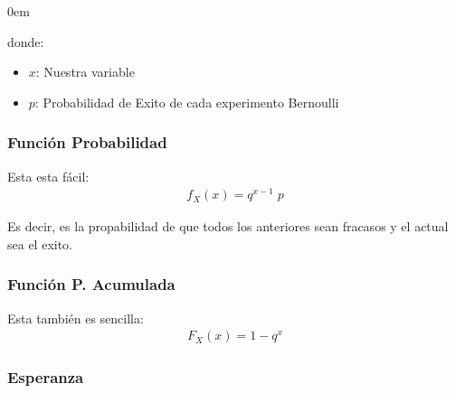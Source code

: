 \documentclass[12pt, fleqn]{report}                             %
\newenvironment{SmallIndentation}[1][0.75em]                    %
        {\begin{adjustwidth}{#1}{}\begin{footnotesize}}             %
        {\end{footnotesize}\end{adjustwidth}}                       %
\theoremstyle{break}                                            %
\begin{document}
\begin{multicols}{2}
\begin{SmallIndentation}[0em]
                            donde:
                            \begin{itemize}
                                \item $x$: Nuestra variable
                                \item $p$: Probabilidad de Exito de cada experimento Bernoulli
                            \end{itemize}


                    \subsubsection{Función Probabilidad}

                        Esta esta fácil:
                        \begin{align*}
                            f_X(x) = q^{x - 1} \; p
                        \end{align*}

                        Es decir, es la propabilidad de que todos los anteriores sean
                        fracasos y el actual sea el exito.


                    \subsubsection{Función P. Acumulada}

                        Esta también es sencilla:
                        \begin{align*}
                            F_X(x) = 1 - q^x
                        \end{align*}

                    \subsubsection{Esperanza}


\end{SmallIndentation}
\end{multicols}
\end{document}
